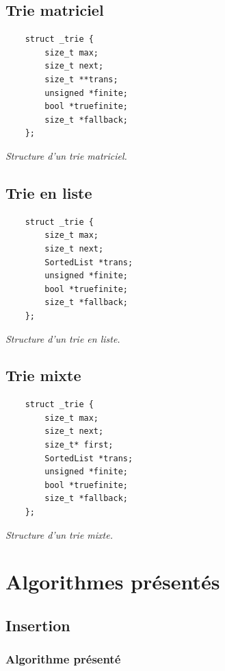\subsection{Trie matriciel}
\begin{verbatim}
    struct _trie {
        size_t max;
        size_t next;
        size_t **trans;
        unsigned *finite;
        bool *truefinite;
        size_t *fallback;
    };
\end{verbatim}
\begin{center}\textit{Structure d'un trie matriciel.}\end{center}

\newpage
\subsection{Trie en liste}
\begin{verbatim}
    struct _trie {
        size_t max;
        size_t next;
        SortedList *trans;
        unsigned *finite;
        bool *truefinite;
        size_t *fallback;
    };
\end{verbatim}
\begin{center}\textit{Structure d'un trie en liste.}\end{center}

\subsection{Trie mixte}
\begin{verbatim}
    struct _trie {
        size_t max;
        size_t next;
        size_t* first;
        SortedList *trans;
        unsigned *finite;
        bool *truefinite;
        size_t *fallback;
    };
\end{verbatim}
\begin{center}\textit{Structure d'un trie mixte.}\end{center}

\newpage
\section{Algorithmes présentés}
\subsection{Insertion}
\subsubsection*{Algorithme présenté}

